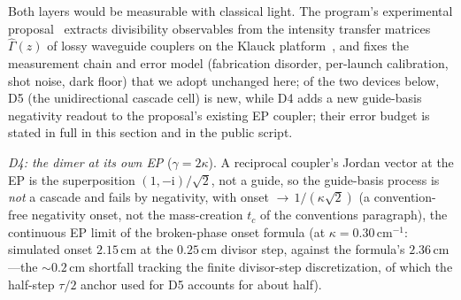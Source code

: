 ﻿\documentclass[11pt]{article}
\newcommand{\ii}{\mathrm{i}}
\theoremstyle{remark}
\begin{document}
Both layers would be measurable with classical light. The
program's experimental proposal~\cite{measurable} extracts
divisibility observables from the intensity transfer matrices
$\hat\Gamma(z)$ of lossy waveguide couplers on the Klauck
platform~\cite{Klauck2019}, and fixes the measurement chain and
error model (fabrication disorder, per-launch calibration, shot
noise, dark floor) that we adopt unchanged here; of the two devices below,
D5 (the unidirectional cascade cell) is new, while D4 adds a new guide-basis
negativity readout to the proposal's existing EP coupler; their error budget
is stated in full in this section and in the public script.

\emph{D4: the dimer at its own EP} ($\gamma=2\kappa$). A reciprocal
coupler's Jordan vector at the EP is the superposition
$(1,-\ii)/\sqrt2$, not a guide, so the guide-basis process is
\emph{not} a cascade and fails by negativity, with onset
${\to}\,1/(\kappa\sqrt2)$ (a convention-free negativity onset, not
the mass-creation $t_c$ of the conventions paragraph), the
continuous EP limit of the
broken-phase onset formula (at $\kappa=0.30$\,cm$^{-1}$: simulated
onset $2.15$\,cm at the $0.25$\,cm divisor step, against the
formula's $2.36$\,cm---the ${\sim}0.2$\,cm shortfall tracking the finite
divisor-step discretization, of which the half-step $\tau/2$ anchor used for
D5 accounts for about half).
\end{document}
